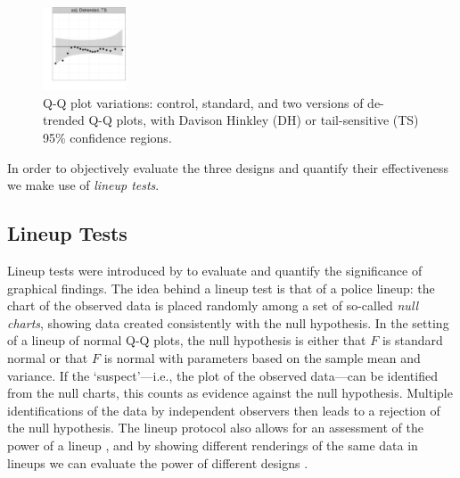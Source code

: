 \documentclass[12pt]{article}\usepackage[]{graphicx}\usepackage[]{color}
\newcommand{\hhnote}[1]{\todo[inline,color=magenta!40]{#1}}
\begin{document}
\begin{figure}
\includegraphics[width=0.22\textwidth]{figures/qqplots-6}
\caption{ \label{qqplots} Q-Q plot variations: control, standard, and two versions of de-trended Q-Q plots, with Davison Hinkley (DH) or tail-sensitive (TS) 95\% confidence regions.}
\end{figure}
\afterpage{\clearpage}


In order to objectively evaluate  the three designs and quantify their effectiveness we make use of {\it lineup tests}.

\subsection{Lineup Tests}
Lineup tests were introduced by \citet{buja:2009hp} to evaluate and quantify the significance of graphical findings. The idea behind a lineup test is that of a police lineup: the chart of the observed data is placed randomly among a set of so-called \emph{null charts}, showing data created consistently with the null hypothesis. In the setting of a lineup of normal Q-Q plots, the null hypothesis  is either that $F$ is standard normal or that $F$ is normal with parameters based on the sample mean and variance.
If the `suspect'---i.e., the plot of the observed data---can be identified from the null charts, this counts as evidence against the null hypothesis. Multiple identifications of the data by independent observers then leads to a rejection of the null hypothesis. 
The lineup protocol also allows for an assessment of the power of a lineup \citep{mahbub:2013},  
and by showing different renderings of the same data in lineups we can evaluate the power  of different designs \citep{Hofmann:2012ts}.
\end{document}
